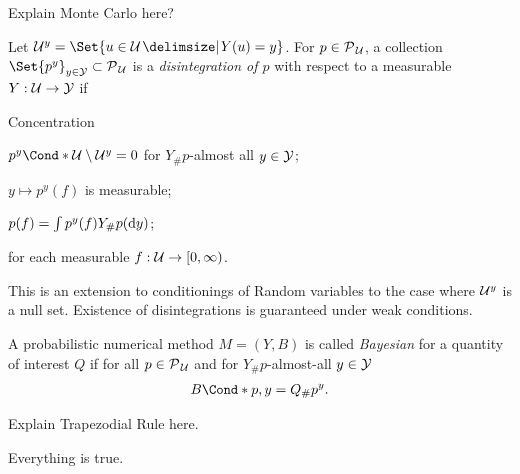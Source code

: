 Explain Monte Carlo here?

\begin{definition}[Disintegration]
    Let $\Uc^y = \Set{u \in \Uc \with Y(u) = y}$.
    For $p \in \operatorname{\mathcal{P}\mkern1mu}_{\mathcal{U}}$, a collection $\Set{p^y}_{y \in \Yc} \subset \Probs{\Uc}$ is a \emph{disintegration of $p$} with respect to a measurable $Y: \mathcal{U} \to \mathcal{Y}$ if
    \begin{labeling}{Concentration\quad}
        \item[Concentration] $\Fun*{p^y}{\Uc \setminus \Uc^y} = 0$ for $Y_\#p$-almost all $y \in \mathcal{Y}$;
        \item[Measurability] $y \mapsto p^y(f)$ is measurable;
        \item[Conditioning] $p(f) = \int p^y(f) Y_\#p(\mathop{}\!\mathrm{d} y)$;
    \end{labeling}
    for each measurable $f : \mathcal{U} \to [0, \infty)$.
\end{definition}
This is an extension to conditionings of Random variables to the case where $\mathcal{U}^y$ is a null set.
Existence of disintegrations is guaranteed under weak conditions.

\begin{definition}
    \label{def:probabilistic_numerics:bayesian_probabilistic_numerical_method}
    A probabilistic numerical method $M = (Y, B)$ is called \emph{Bayesian} for a quantity of interest $Q$ if for all $p \in \operatorname{\mathcal{P}\mkern1mu}_{\mathcal{U}}$ and for $Y_\#p$-almost-all $y \in \mathcal{Y}$
    \begin{align}
        \Fun*{B}{p, y} = Q_\#p^y.
    \end{align}
\end{definition}

Explain Trapezodial Rule here.
\begin{theorem}
    Everything is true.
\end{theorem}


